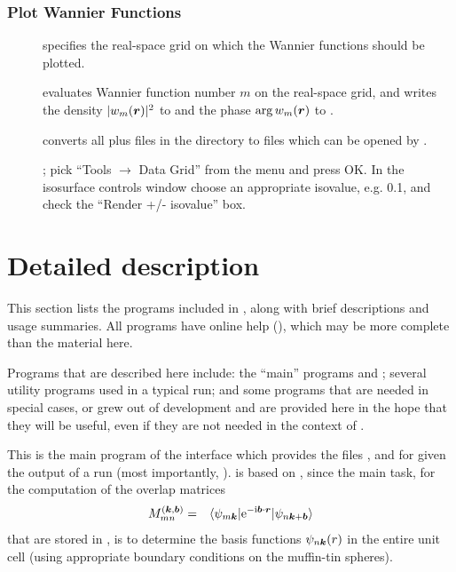\subsection{Plot Wannier Functions}
\begin{description}
\item[] specifies the real-space grid on which the
  Wannier functions should be plotted.
\item[] evaluates Wannier function number
  $m$ on the real-space grid, and writes the density $|w_m(\boldsymbol r)|^2$
  to  and the phase $\arg w_m(\boldsymbol r)$
  to .
\item [\wplottoxsf] converts all  plus
   files in the directory to  files
  which can be opened by \xcrys.
\item [] ; pick
  ``Tools $\rightarrow$ Data Grid'' from the menu and press OK. In the
  isosurface controls window choose an appropriate isovalue, e.g. 0.1,
  and check the ``Render +/- isovalue'' box.
\end{description}


\chapter{Detailed description}
\label{sec:detaileddescription}
\minitoc

This section lists the programs included in \wtow, along with brief
descriptions and usage summaries.  All programs have online help
(), which may be more complete than the material here.

Programs that are described here include: the ``main'' \wtow programs
\wiiw and \wplot; several utility programs used in a typical \wtow
run; and some programs that are needed in special cases, or grew out
of \wtow development and are provided here in the hope that they will
be useful, even if they are not needed in the context of \wtow.



This is the main program of the interface which provides the files
,  and  for \wannier
given the output of a \wien run (most importantly,
).  \wiiw is based on , since the main
task, for the computation of the overlap matrices
\begin{eqnarray}
\label{eq:mmn}
M_{mn}^{(\boldsymbol{k},\boldsymbol{b})}&=&\langle
\psi_{m\boldsymbol{k}}|\text{e}^{-\text{i}\boldsymbol{b}\cdot\boldsymbol{r}}|\psi_{n\boldsymbol{k}+\boldsymbol{b}}
\rangle
\label{eq:mmn2}
\end{eqnarray}
that are stored in , is to determine the basis
functions $\psi_{n\boldsymbol k}(r)$ in the entire unit cell (using
appropriate boundary conditions on the muffin-tin spheres).

